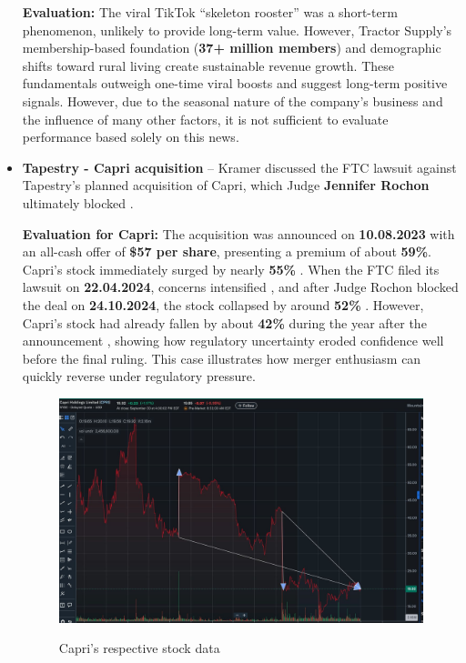 \documentclass[12pt,a4paper]{article}
\begin{document}
\begin{itemize}
     \textbf{Evaluation:} The viral TikTok “skeleton rooster” was a short-term phenomenon, unlikely to provide long-term value. 
    However, Tractor Supply’s membership-based foundation (\textbf{37+ million members}) 
    and demographic shifts toward rural living create sustainable revenue growth. 
    These fundamentals outweigh one-time viral boosts and suggest long-term positive signals. However, due to the seasonal nature of the company’s business and the influence of many other factors, it is not sufficient to evaluate performance based solely on this news.
\newpage


    \item \textbf{Tapestry - Capri acquisition} -- Kramer discussed the FTC lawsuit against Tapestry’s planned acquisition of Capri, 
    which Judge \textbf{Jennifer Rochon} ultimately blocked \cite{ftc}. 
\vspace{0.3cm}
    
\textbf{Evaluation for Capri:} The acquisition was announced on \textbf{10.08.2023} with an all-cash 
offer of \textbf{\$57 per share}, presenting a premium of about \textbf{59\%}. 
Capri’s stock immediately surged by nearly \textbf{55\%} \cite{CPRI}. 
When the FTC filed its lawsuit on \textbf{22.04.2024}, concerns intensified \cite{ftc}, 
and after Judge Rochon blocked the deal on \textbf{24.10.2024}, 
the stock collapsed by around \textbf{52\%} \cite{CPRI}. 
However, Capri’s stock had already fallen by about \textbf{42\%} during the year after the announcement \cite{CPRI}, 
showing how regulatory uncertainty eroded confidence well before the final ruling. 
This case illustrates how merger enthusiasm can quickly reverse under regulatory pressure.
\vspace{1.1cm}

\begin{figure}[H]
    \centering
    \includegraphics[width=0.85\linewidth]{capri.jpeg}
    \caption{Capri's respective stock data}\cite{CPRI}
    \label{fig:capri}
\end{figure}
\FloatBarrier


\end{itemize}
\end{document}
